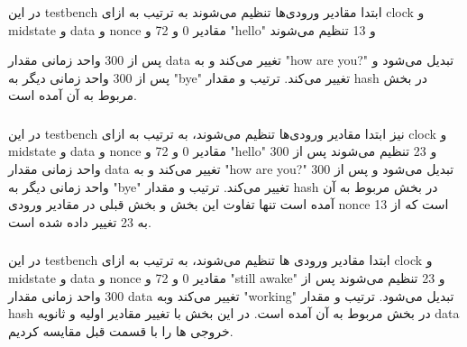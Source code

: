 در این testbench ابتدا مقادیر ورودی‌ها تنظیم می‌شوند
به ترتیب به ازای clock  و midstate و data و nonce مقادیر 0 و 72 و 
"hello"
 و 13 تنظیم می‌شوند

پس از 300 واحد زمانی مقدار data تغییر می‌کند و به
"how are you?"
 تبدیل می‌شود و پس از 300 واحد زمانی دیگر به 
 "bye"
 تغییر می‌کند.
ترتیب و مقدار hash در بخش مربوط به آن آمده است.

\subsubsection{}

در این testbench نیز ابتدا مقادیر ورودی‌ها تنظیم می‌شوند،
به ترتیب به ازای clock  و midstate و data و nonce مقادیر 0 و 72 و 
"hello"
و 23 تنظیم می‌شوند
پس از 300 واحد زمانی مقدار data تغییر می‌کند و به 
"how are you?"
تبدیل می‌شود و پس از 300 واحد زمانی دیگر به 
"bye"
 تغییر می‌کند.
ترتیب و مقدار hash در بخش مربوط به آن آمده است
تنها تفاوت این بخش و بخش قبلی در مقادیر ورودی nonce است که از 13 به 23 تغییر داده شده است.


\subsubsection{}
در این testbench ابتدا مقادیر ورودی ها تنظیم می‌شوند،
به ترتیب به ازای clock  و midstate و data و nonce مقادیر 0 و 72 و 
"still awake"
 و 23 تنظیم می‌شوند
پس از 300 واحد زمانی مقدار data تغییر می‌کند وبه 
"working"
 تبدیل می‌شود.
ترتیب و مقدار hash در بخش مربوط به آن آمده است.
در این بخش با تغییر مقادیر اولیه و ثانویه data خروجی ها را با قسمت قبل مقایسه کردیم.

